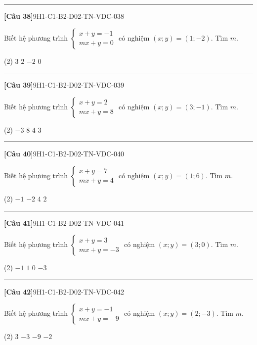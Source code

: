 \documentclass[12pt,a4paper]{article}
\newif\ifloigiai
\newenvironment{cauhoi}[2]{%
  \par\medskip\noindent\rule{\textwidth}{0.4pt}\par\nopagebreak
  \noindent\textbf{[#1]}\hfill{\scriptsize\ttfamily #2}\par\nopagebreak\smallskip}{\par}
\newcommand{\dapan}[1]{\ifloigiai\par\smallskip\noindent\textit{Đáp án:} \textbf{#1}\par\fi}
\begin{document}
\begin{cauhoi}{Câu 38}{9H1-C1-B2-D02-TN-VDC-038}
Biết hệ phương trình $\begin{cases}x+y=-1\\ mx+y=0\end{cases}$ có nghiệm $(x;y)=(1;-2)$. Tìm $m$.
\begin{tasks}(2)
\task $3$
\task $2$
\task $-2$
\task $0$
\end{tasks}
\dapan{B}
\end{cauhoi}
\begin{cauhoi}{Câu 39}{9H1-C1-B2-D02-TN-VDC-039}
Biết hệ phương trình $\begin{cases}x+y=2\\ mx+y=8\end{cases}$ có nghiệm $(x;y)=(3;-1)$. Tìm $m$.
\begin{tasks}(2)
\task $-3$
\task $8$
\task $4$
\task $3$
\end{tasks}
\dapan{D}
\end{cauhoi}
\begin{cauhoi}{Câu 40}{9H1-C1-B2-D02-TN-VDC-040}
Biết hệ phương trình $\begin{cases}x+y=7\\ mx+y=4\end{cases}$ có nghiệm $(x;y)=(1;6)$. Tìm $m$.
\begin{tasks}(2)
\task $-1$
\task $-2$
\task $4$
\task $2$
\end{tasks}
\dapan{B}
\end{cauhoi}
\begin{cauhoi}{Câu 41}{9H1-C1-B2-D02-TN-VDC-041}
Biết hệ phương trình $\begin{cases}x+y=3\\ mx+y=-3\end{cases}$ có nghiệm $(x;y)=(3;0)$. Tìm $m$.
\begin{tasks}(2)
\task $-1$
\task $1$
\task $0$
\task $-3$
\end{tasks}
\dapan{A}
\end{cauhoi}
\begin{cauhoi}{Câu 42}{9H1-C1-B2-D02-TN-VDC-042}
Biết hệ phương trình $\begin{cases}x+y=-1\\ mx+y=-9\end{cases}$ có nghiệm $(x;y)=(2;-3)$. Tìm $m$.
\begin{tasks}(2)
\task $3$
\task $-3$
\task $-9$
\task $-2$
\end{tasks}
\dapan{B}
\end{cauhoi}
\end{document}
